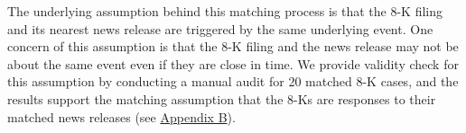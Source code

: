 \documentclass[letterpaper,12pt]{article}
\begin{document}
\begin{spacing}{1.5}
The underlying assumption behind this matching process is that the 8-K filing and its nearest news release are triggered by the same underlying event. One concern of this assumption is that the 8-K filing and the news release may not be about the same event even if they are close in time. We provide validity check for this assumption by conducting a manual audit for 20 matched 8-K cases, and the results support the matching assumption that the 8-Ks are responses to their matched news releases (see \hyperref[appb]{Appendix B}).


\end{spacing}
\end{document}
